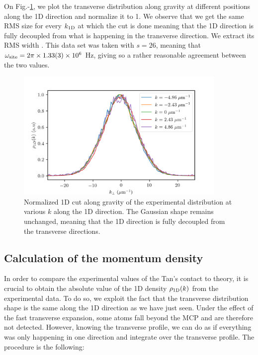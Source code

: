On Fig.-\ref{fig:1D_transverse}, we plot the transverse distribution along gravity at different positions along the 1D direction and normalize it to 1. We observe that we get the same RMS size for every $k_{\rm{1D}}$ at which the cut is done meaning that the 1D direction is fully decoupled from what is happening in the transverse direction. We extract its RMS width . This data set was taken with $s=26$, meaning that $\omega_{\rm{site}}=2 \pi \times 1.33(3) \times 10^6$ Hz, giving  so a rather reasonable agreement between the two values. 

\begin{figure}
    \centering
    \includegraphics[width=0.9\textwidth]{Fig/Chapter5/1D_transverse_effect.png}
    \caption[Normalized 1D cut along gravity of the experimental distribution at various $k$ along the 1D direction]{Normalized 1D cut along gravity of the experimental distribution at various $k$ along the 1D direction. The Gaussian shape remains unchanged, meaning that the 1D direction is fully decoupled from the transverse directions.}
    \label{fig:1D_transverse}
\end{figure}

\subsection{Calculation of the momentum density}


\label{sec:1D_calculation_momentum_density}

In order to compare the experimental values of the Tan's contact to theory, it is crucial to obtain the absolute value of the 1D density $\rho_{\rm{1D}}(k)$ from the experimental data. To do so, we exploit the fact that the transverse distribution shape is the same along the 1D direction as we have just seen. Under the effect of the fast transverse expansion, some atoms fall beyond the MCP and are therefore not detected. However, knowing the transverse profile, we can do as if everything was only happening in one direction and integrate over the transverse profile. The procedure is the following:

